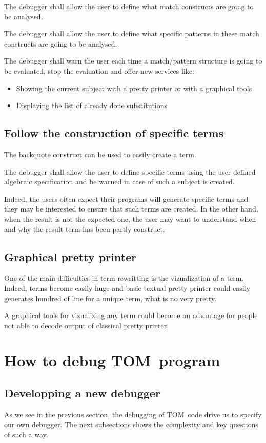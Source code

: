 \documentclass[a4paper]{article}
\newcommand{\TOM}{\textsf{TOM}}
\begin{document}
The debugger shall allow the user to define what match constructs are
going to be analysed.

The debugger shall allow the user to define what specific patterns in
these match constructs are going to be analysed.

The debugger shall warn the user each time a match/pattern structure
is going to be evaluated, stop the evaluation and offer new services like:
\begin{itemize}
\item Showing the current subject with a pretty printer or with a
  graphical tools
\item Displaying the list of already done substitutions
\end{itemize}


\subsection{Follow the construction of specific terms}
The backquote construct can be used to easily create a term.

The debugger shall allow the user to define specific terms using the
user defined algebraic specification and be warned in case of such a
subject is created. 

Indeed, the users  often expect their programs will generate specific
terms and they may be interested to ensure that such terms are
created. In the other hand, when the result is not the expected one,
the user may want to understand when and why the result term has been
partly construct.


\subsection{Graphical pretty printer}
One of the main difficulties in term rewritting is the vizualization
of a term. Indeed, terms become easily huge and basic textual pretty printer
could easily generates hundred of line for a unique term, what is no
very pretty.

A graphical tools for vizualizing any term could become an advantage
for people not able to decode output of classical pretty printer.

\newpage

\section{How to debug \TOM\ program}
\subsection{Developping a new debugger}
As we see in the previous section, the debugging of \TOM\ code drive
us to specify our own debugger. The next subsections shows the
complexity and key questions of such a way. 
\end{document}
